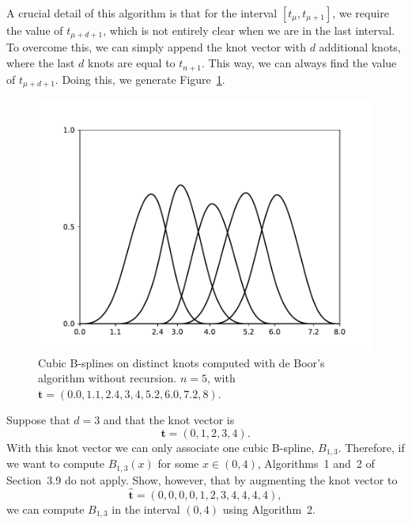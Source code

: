 \begin{solution}
    A crucial detail of this algorithm is that for the interval $[t_{\mu}, t_{\mu+1}]$, we require the value of $t_{\mu + d + 1}$, which is not entirely clear when we are in the last interval.
    To overcome this, we can simply append the knot vector with $d$ additional knots, where the last $d$ knots are equal to $t_{n+1}$.
    This way, we can always find the value of $t_{\mu + d + 1}$.
    Doing this, we generate Figure~\ref{fig:spline_deboor}.

    \begin{figure}[ht]
        \centering
        \includegraphics[width=0.6\linewidth]{3_bsplines/de_boor.pdf}
        \caption{Cubic B-splines on distinct knots computed with de Boor's algorithm without recursion. $n = 5$, with $\mathbf{t} = (0.0, 1.1, 2.4, 3, 4, 5.2, 6.0, 7.2, 8)$.\label{fig:spline_deboor}}
    \end{figure}
\end{solution}

\begin{exercise}
    Suppose that $d = 3$ and that the knot vector is
    \begin{equation*}
        \mathbf{t} = (0, 1, 2, 3, 4).
    \end{equation*}
    With this knot vector we can only associate one cubic B-spline, $B_{1,3}$.
    Therefore, if we want to compute $B_{1,3}(x)$ for some $x \in (0, 4)$, Algorithms~1 and~2 of Section~3.9 do not apply.
    Show, however, that by augmenting the knot vector to
    \begin{equation*}
        \hat{\mathbf{t}} = (0, 0, 0, 0, 1, 2, 3, 4, 4, 4, 4),
    \end{equation*}
    we can compute $B_{1,3}$ in the interval $(0, 4)$ using Algorithm~2.
\end{exercise}

